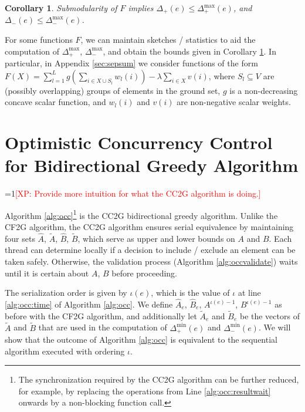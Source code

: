 \documentclass{article} %
\newcommand{\hogwild}{CF2G}
\newcommand{\occ}{CC2G}
\newtheorem{cor}[thm]{Corollary}
\newcommand{\Comments}{1}
\newcommand{\note}[2]{\ifnum\Comments=1\textcolor{#1}{#2}\fi}
\newcommand{\xinghao}[1]{\note{red}{[XP: #1]}}
\begin{document}
\begin{cor}\label{cor:hog:delta_bound}
Submodularity of $F$ implies
$\Delta_{+}(e) \leq \Delta_{+}^{\max}(e)$, and
$\Delta_{-}(e) \leq \Delta_{-}^{\max}(e)$.
\end{cor}


For some functions $F$, we can maintain sketches / statistics to aid the computation of $\Delta_+^{\max}$, $\Delta_-^{\max}$, and obtain the bounds given in Corollary \ref{cor:hog:delta_bound}.
In particular, in Appendix \ref{sec:sepsum} we consider functions of the form
$F(X) = \sum_{l=1}^L g\left(\sum_{i\in X\cup S_l} w_l(i)\right) - \lambda\sum_{i\in X} v(i)$,
where $S_l \subseteq V$ are (possibly overlapping) groups of elements in the ground set, $g$ is a non-decreasing concave scalar function, and $w_l(i)$ and $v(i)$ are non-negative scalar weights.










\section{Optimistic Concurrency Control for Bidirectional Greedy Algorithm}
\xinghao{Provide more intuition for what the \occ{} algorithm is doing.}

Algorithm \ref{alg:occ}\footnote{The synchronization required by the \occ{} algorithm can be further reduced, for example, by replacing the operations from Line \ref{alg:occ:resultwait} onwards by a non-blocking function call.} is the \occ{} bidirectional greedy algorithm.
Unlike the \hogwild{} algorithm, the \occ{} algorithm ensures serial equivalence by maintaining four sets $\hat{A}$, $\tilde{A}$, $\hat{B}$, $\tilde{B}$, which serve as upper and lower bounds on $A$ and $B$.
Each thread can determine locally if a decision to include / exclude an element can be taken safely.
Otherwise, the validation process (Algorithm \ref{alg:occvalidate}) waits until it is certain about $A$, $B$ before proceeding.

The serialization order is given by $\iota(e)$, which is the value of $\iota$ at line \ref{alg:occ:time} of Algorithm \ref{alg:occ}.
We define $\hat{A}_e$, $\hat{B}_e$, $A^{\iota(e)-1}$, $B^{\iota(e)-1}$ as before with the \hogwild{} algorithm, and additionally let $\tilde{A}_e$ and $\tilde{B}_e$ be the vectors of $\tilde{A}$ and $\tilde{B}$ that are used in the computation of $\Delta_+^{\min}(e)$ and $\Delta_-^{\min}(e)$.
We will show that the outcome of Algorithm \ref{alg:occ} is equivalent to the sequential algorithm executed with ordering $\iota$.
\end{document}
